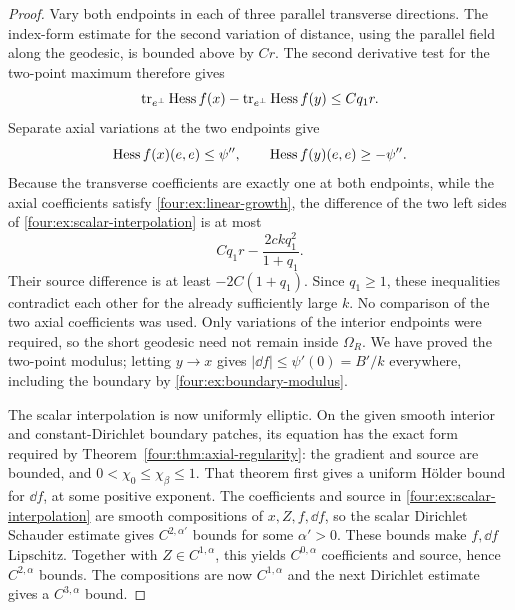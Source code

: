 \begin{proof}
Vary both endpoints in each of three parallel transverse directions.
The index-form estimate for the second variation of distance, using
the parallel field along the geodesic, is bounded above by $Cr$.
The second derivative test for the two-point maximum therefore gives
\[
 \operatorname{tr}_{e^\perp}\operatorname{Hess} f(x)-\operatorname{tr}_{e^\perp}\operatorname{Hess} f(y)
 \le Cq_1r.
\]
Separate axial variations at the two endpoints give
\[
 \operatorname{Hess} f(x)(e,e)\le\psi'',\qquad
 \operatorname{Hess} f(y)(e,e)\ge-\psi''.
\]
Because the transverse coefficients are exactly one at both endpoints,
while the axial coefficients satisfy \eqref{four:ex:linear-growth}, the
difference of the two left sides of \eqref{four:ex:scalar-interpolation} is
at most
\[
 Cq_1r-\frac{2ckq_1^2}{1+q_1}.
\]
Their source difference is at least $-2C(1+q_1)$.  Since $q_1\ge1$,
these inequalities contradict each other for the already sufficiently
large $k$.  No comparison of the two axial coefficients was used.
Only variations of the interior endpoints were required, so the
short geodesic need not remain inside $\Omega_R$.
We have proved the two-point modulus; letting $y\to x$ gives
$|\dd f|\le\psi'(0)=B'/k$ everywhere, including the boundary by
\eqref{four:ex:boundary-modulus}.

The scalar interpolation is now uniformly elliptic.  On the given
smooth interior and constant-Dirichlet boundary patches, its equation
has the exact form required by Theorem~\ref{four:thm:axial-regularity}:
the gradient and source are bounded, and
$0<\chi_0\le\chi_\beta\le1$.  That theorem first gives a uniform
H\"older bound for $\dd f$, at some positive exponent.  The coefficients
and source in \eqref{four:ex:scalar-interpolation} are smooth compositions
of $x,Z,f,\dd f$, so the scalar Dirichlet Schauder estimate gives
$C^{2,\alpha'}$ bounds for some $\alpha'>0$.  These bounds make
$f,\dd f$ Lipschitz.  Together with $Z\in C^{1,\alpha}$, this yields
$C^{0,\alpha}$ coefficients and source, hence $C^{2,\alpha}$ bounds.
The compositions are now $C^{1,\alpha}$ and the next Dirichlet estimate
gives a $C^{3,\alpha}$ bound.


\end{proof}
